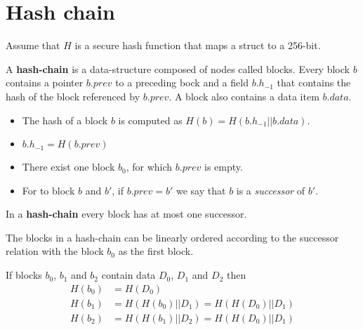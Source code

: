 
\section{Hash chain}

Assume that $H$ is a secure hash function that maps a struct to a 256-bit.

\begin{definition}
A \textbf{hash-chain} is a data-structure composed of nodes called blocks. 
Every block $b$ contains a pointer $b.prev$ to a preceding bock and a field $b.h_{-1}$ 
that contains the hash of the block referenced by $b.prev$.
A block also contains a data item $b.data$.

\begin{itemize}
	\item The hash of a block $b$ is computed as $H(b)= H(b.h_{-1} || b.data)$.
	\item $b.h_{-1}=H(b.prev)$
	\item There exist one block $b_0$, for which $b.prev$ is empty.
	\item For to block $b$ and $b'$, if $b.prev=b'$ we say that $b$ is a \emph{successor} of $b'$.
	
\end{itemize}

In a \textbf{hash-chain} every block has at most one successor.
\end{definition}



\begin{lem}
The blocks in a hash-chain can be linearly ordered according to the successor relation with the block $b_0$ as the first block.
\end{lem}


\begin{note}
	If blocks $b_0$, $b_1$ and $b_2$ contain data $D_0$, $D_1$ and $D_2$ then
\begin{align*}
	H(b_0) & = H(D_0)\\
	H(b_1) & = H( H(b_0) || D_1) = H( H(D_0)|| D_1) \\
	H(b_2) & = H( H(b_1) || D_2) = H( H(D_0)|| D_1) \\
\end{align*}

\end{note}


